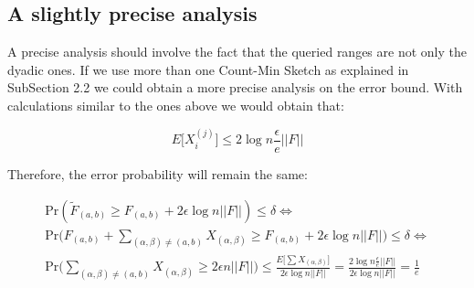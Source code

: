 \documentclass{article}
\begin{document}
\subsection{A slightly precise analysis}

A precise analysis should involve the fact that the queried ranges are not only the dyadic ones. If we use more than one Count-Min Sketch as explained 
in SubSection 2.2 we could obtain a more precise analysis on the error bound. With calculations similar to the ones above we would obtain that:

\begin{equation*}
    E\big[X_{i}^{(j)}\big] \le 2 \log n \frac{\epsilon}{e} ||F||
\end{equation*}

\noindent Therefore, the error probability will remain the same:

\begin{gather*}
    \textrm{Pr}(\tilde{F}_{(a, b)} \ge F_{(a, b)} + 2\epsilon \log n ||F||) \le \delta \iff \\
    \textrm{Pr}\bigg(F_{(a, b)} + \sum_{(\alpha, \beta) \ne (a, b)}X_{(\alpha, \beta)} \ge F_{(a, b)} + 2 \epsilon \log n ||F|| \bigg) \le \delta \iff \\
    \textrm{Pr}\bigg(\sum_{(\alpha, \beta) \ne (a, b)}X_{(\alpha, \beta)} \ge 2 \epsilon n ||F||\bigg) \le \frac{E\bigg[\sum X_(\alpha, \beta)\bigg]}{2 \epsilon \log n ||F||} = \frac{2 \log n \frac{\epsilon}{e} ||F||}{2 \epsilon \log n ||F||} = \frac{1}{e}
\end{gather*}
\end{document}
